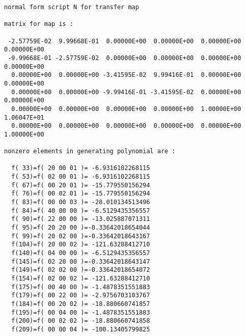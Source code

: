 \begin{footnotesize}
\begin{verbatim}
normal form script N for transfer map

matrix for map is :

 -2.57759E-02  9.99668E-01  0.00000E+00  0.00000E+00  0.00000E+00  0.00000E+00
 -9.99668E-01 -2.57759E-02  0.00000E+00  0.00000E+00  0.00000E+00  0.00000E+00
  0.00000E+00  0.00000E+00 -3.41595E-02  9.99416E-01  0.00000E+00  0.00000E+00
  0.00000E+00  0.00000E+00 -9.99416E-01 -3.41595E-02  0.00000E+00  0.00000E+00
  0.00000E+00  0.00000E+00  0.00000E+00  0.00000E+00  1.00000E+00  1.06047E+01
  0.00000E+00  0.00000E+00  0.00000E+00  0.00000E+00  0.00000E+00  1.00000E+00

nonzero elements in generating polynomial are :

  f( 33)=f( 20 00 01 )= -6.9316102268115
  f( 53)=f( 02 00 01 )= -6.9316102268115
  f( 67)=f( 00 20 01 )= -15.779550156294
  f( 76)=f( 00 02 01 )= -15.779550156294
  f( 83)=f( 00 00 03 )= -28.010134513496
  f( 84)=f( 40 00 00 )= -6.5129435356557
  f( 90)=f( 22 00 00 )= -13.025887071311
  f( 95)=f( 20 20 00 )=-0.33642018654044
  f( 99)=f( 20 02 00 )=-0.33642018643167
  f(104)=f( 20 00 02 )= -121.63288412710
  f(140)=f( 04 00 00 )= -6.5129435356557
  f(145)=f( 02 20 00 )=-0.33642018643147
  f(149)=f( 02 02 00 )=-0.33642018654072
  f(154)=f( 02 00 02 )= -121.63288412710
  f(175)=f( 00 40 00 )= -1.4878351551883
  f(179)=f( 00 22 00 )= -2.9756703103767
  f(184)=f( 00 20 02 )= -18.880660741857
  f(195)=f( 00 04 00 )= -1.4878351551883
  f(200)=f( 00 02 02 )= -18.880660741858
  f(209)=f( 00 00 04 )= -100.13405799825
\end{verbatim}
\end{footnotesize}

\newpage
